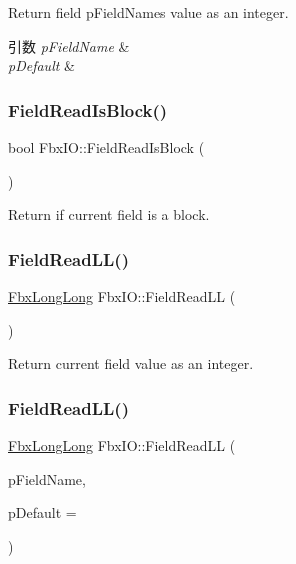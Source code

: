 Return field p\+Field\+Name\textquotesingle{}s value as an integer. 
\begin{DoxyParams}{引数}
{\em p\+Field\+Name} & \\
\hline
{\em p\+Default} & \\
\hline
\end{DoxyParams}
\mbox{\label{class_fbx_i_o_ac9c7d089db2f954f947e5b97a23e6f89}} 
\subsubsection{\texorpdfstring{Field\+Read\+Is\+Block()}{FieldReadIsBlock()}}
{\footnotesize\ttfamily bool Fbx\+I\+O\+::\+Field\+Read\+Is\+Block (\begin{DoxyParamCaption}{ }\end{DoxyParamCaption})}



Return if current field is a block. 

\mbox{\label{class_fbx_i_o_a137305d10c734aaaccdec29340d0f354}} 
\subsubsection{\texorpdfstring{Field\+Read\+L\+L()}{FieldReadLL()}\hspace{0.1cm}{\footnotesize\ttfamily [1/2]}}
{\footnotesize\ttfamily \hyperlink{fbxtypes_8h_ac34da60c22b0a7e1156e5480da7d71f1}{Fbx\+Long\+Long} Fbx\+I\+O\+::\+Field\+Read\+LL (\begin{DoxyParamCaption}{ }\end{DoxyParamCaption})}



Return current field value as an integer. 

\mbox{\label{class_fbx_i_o_ad18d260feb1671e93c613d5144cd1049}} 
\subsubsection{\texorpdfstring{Field\+Read\+L\+L()}{FieldReadLL()}\hspace{0.1cm}{\footnotesize\ttfamily [2/2]}}
{\footnotesize\ttfamily \hyperlink{fbxtypes_8h_ac34da60c22b0a7e1156e5480da7d71f1}{Fbx\+Long\+Long} Fbx\+I\+O\+::\+Field\+Read\+LL (\begin{DoxyParamCaption}\item[{const char $\ast$}]{p\+Field\+Name,  }\item[{\hyperlink{fbxtypes_8h_ac34da60c22b0a7e1156e5480da7d71f1}{Fbx\+Long\+Long}}]{p\+Default = {} }\end{DoxyParamCaption})}

